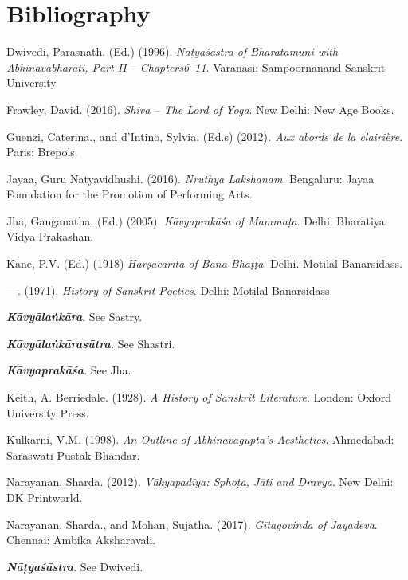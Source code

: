\section*{Bibliography}

\begin{thebibliography}{99}
\itemsep=0pt
 Dwivedi, Parasnath. (Ed.) (1996). \textit{Nāṭyaśāstra of Bharatamuni with Abhinavabhārati, Part II – Chapters6–11}. Varanasi: Sampoornanand Sanskrit University.

  Frawley, David. (2016). \textit{Shiva – The Lord of Yoga}. New Delhi: New Age Books.

  Guenzi, Caterina., and d’Intino, Sylvia. (Ed.s) (2012)\textit{. Aux abords de la clairière}. Paris: Brepols.

  Jayaa, Guru Natyavidhushi. (2016). \textit{Nruthya Lakshanam}. Bengaluru: Jayaa Foundation for the Promotion of Performing Arts.

  Jha, Ganganatha. (Ed.) (2005). \textit{Kāvyaprakāśa of Mammaṭa}. Delhi: Bharatiya Vidya Prakashan.

  Kane, P.V. (Ed.) (1918) \textit{Harṣacarita of Bāna Bhaṭṭa}. Delhi. Motilal Banarsidass.

  —. (1971). \textit{History of Sanskrit Poetics}. Delhi: Motilal Banarsidass.

  \textit{\textbf{Kāvyālaṅkāra}}. See Sastry.

  \textit{\textbf{Kāvyālaṅkārasūtra}. }See Shastri.

  \textit{\textbf{Kāvyaprakāśa}}. See Jha.

  Keith, A. Berriedale. (1928). \textit{A History of Sanskrit Literature}. London: Oxford University Press.

  Kulkarni, V.M. (1998). \textit{An Outline of Abhinavagupta’s Aesthetics}. Ahmedabad: Saraswati Pustak Bhandar.

  Narayanan, Sharda. (2012). \textit{Vākyapadīya: Sphoṭa, Jāti and Dravya}. New Delhi: DK Printworld.

  Narayanan, Sharda., and Mohan, Sujatha. (2017).\textit{ Gītagovinda of Jayadeva}. Chennai: Ambika Aksharavali.

  \textit{\textbf{Nāṭyaśāstra}}. See Dwivedi.


\end{thebibliography}
